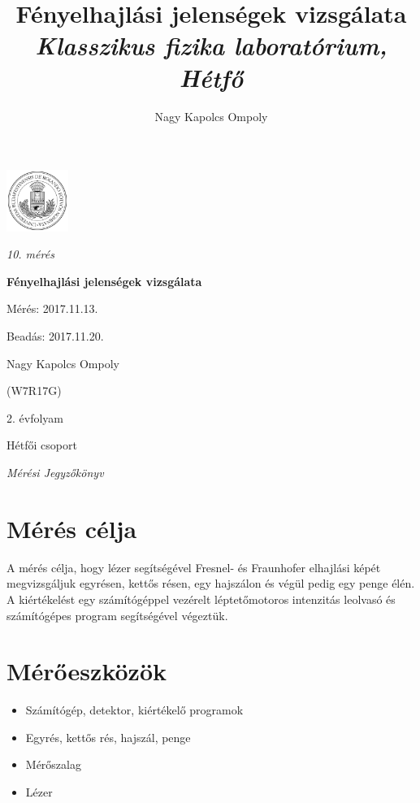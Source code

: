 \documentclass[a4paper,11pt]{article}
\author{Nagy Kapolcs Ompoly}
\title{Fényelhajlási jelenségek vizsgálata \\ \textsl{\small{Klasszikus fizika laboratórium, Hétfő}}}
\date{ }
\begin{document}
\begin{titlepage}
	\centering
	\includegraphics[width=0.15\textwidth]{eltecimer.jpg}\par
	\vspace{1cm}
	{\Large\itshape 10. mérés \par}
	{\huge\bfseries Fényelhajlási jelenségek vizsgálata\par}
	
	\vfill
	
	\raggedleft
	Mérés: 2017.11.13.\par
	Beadás: 2017.11.20.\par
	\vspace{0.5cm}
	Nagy Kapolcs Ompoly\par
	(W7R17G)\par
	2. évfolyam\par
	Hétfői csoport\par
	
	\vspace{0.5cm}

	\centering
	{\small\itshape Mérési Jegyzőkönyv \par}
\end{titlepage}
\clearpage
\setcounter{page}{1}
\newpage
\renewcommand{\thesection}{\Roman{section}}
\renewcommand{\thesubsection}{\thesection.\arabic{subsection}}
\renewcommand{\thesubsubsection}{\thesubsection.\arabic{subsubsection}}
\section{Mérés célja}
A mérés célja, hogy lézer segítségével Fresnel- és Fraunhofer elhajlási képét megvizsgáljuk egyrésen, kettős résen, egy hajszálon és végül pedig egy penge élén. A kiértékelést egy számítógéppel vezérelt léptetőmotoros intenzitás leolvasó és számítógépes program segítségével végeztük.

\section{Mérőeszközök}

\begin{itemize}
	\item Számítógép, detektor, kiértékelő programok
	\item Egyrés, kettős rés, hajszál, penge
	\item Mérőszalag
	\item Lézer 
\end{itemize}
\end{document}
